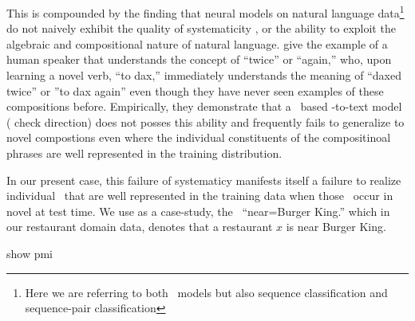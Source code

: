 This is compounded by the finding that neural models on natural language data\footnote{Here we are referring to both \sequencetosequence~models but also 
sequence classification and sequence-pair classification }  do not 
naively exhibit the quality of systematicity \citep{fodor,genwosys}, or 
the ability to exploit the algebraic and compositional 
nature of natural language. \citet{genwosys} give the example of a human
speaker that understands the concept of ``twice'' or ``again,'' who, upon
learning a novel verb, ``to dax,'' immediately understands the meaning 
of ``daxed twice'' or ''to dax again'' even though they have never seen 
examples of these compositions before. Empirically, they demonstrate that a
\recurrentneuralnetwork~based \meaningrepresentation-to-text model ({\color{red} check direction}) does not posses this ability and frequently fails to 
generalize to novel compostions even where the individual constituents of 
the compositinoal phrases are well represented in the training distribution.

In our present case, this failure of systematicy manifests itself a failure
to realize individual \attributevalues~that are well represented in the 
training data when those \attributevalues~occur in novel \meaningrepresentations at test time. We use as a case-study, the \attributevalue~``near=Burger King.'' which in our restaurant domain data, denotes that a restaurant $x$ is near
Burger King.


show pmi\\

